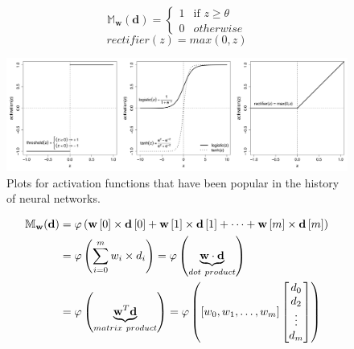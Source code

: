 \documentclass[xcolor={table}]{beamer}
\begin{document}
 \begin{frame} 
	\begin{equation}
\mathbb{M}_{\mathbf{w}}(\mathbf{d}) = 	\begin{cases}
		1 & \text{if } z \geq \theta\\
		0 & otherwise
	\end{cases}
	\label{eqn:thresholdfunction}
\end{equation}
\begin{equation}
	rectifier(z)=max(0,z)
	\label{eqn:rectifier}
\end{equation}
\end{frame} 



 \begin{frame} 
\begin{figure}[t]
\centerline{
\includegraphics[width=\linewidth]{./images/fmlpda_8_02.pdf}
}
\caption[Plots for activation functions that have been popular in the history of neural networks.]{Plots for activation functions that have been popular in the history of neural networks.}
\label{fig:activationfunctions}
\end{figure}
\end{frame} 



 \begin{frame} 
\begin{alignat}{2}
	\mathbb{M}_{\mathbf{w}}(\mathbf{d}) &=  \varphi\left(\mathbf{w}\left[0\right] \times \mathbf{d}\left[0\right] + \mathbf{w}\left[1\right] \times \mathbf{d}\left[1\right] + \dots + \mathbf{w}\left[m\right] \times \mathbf{d}\left[m\right]\right) \notag \\
	 &=  \varphi \left( \sum_{i=0}^{m}w_i \times d_i \right) 
	  = \varphi\left(\underbrace{\mathbf{w} \cdot \mathbf{d}}_{dot~product}\right) \notag \\ 
	  &= \varphi\left(\underbrace{\mathbf{w}^T \mathbf{d}}_{matrix~product}\right) 
	  = \varphi \left([w_0,w_1,\dots,w_m] \begin{bmatrix}
       d_{0} \\
       d_{2} \\
       \vdots \\
       d_{m}
     \end{bmatrix}\right)
	\label{eqn:neuron}
\end{alignat}
\end{frame} 
\end{document}
